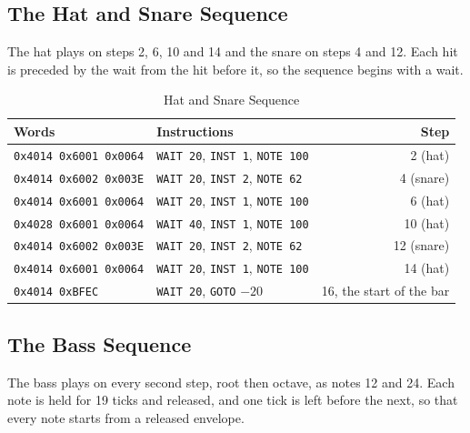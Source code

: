 \subsection{The Hat and Snare Sequence}

The hat plays on steps 2, 6, 10 and 14 and the snare on steps 4 and 12. Each hit is preceded by the wait from the hit
before it, so the sequence begins with a wait.

\begin{table}[H]
	\centering
	\small
	\begin{tabular}{p{5.4cm}p{5.4cm}r}
		\toprule
		\textbf{Words}                & \textbf{Instructions}                                & \textbf{Step}            \\
		\midrule
		\texttt{0x4014 0x6001 0x0064} & \texttt{WAIT 20}, \texttt{INST 1}, \texttt{NOTE 100} & 2 (hat)                  \\
		\texttt{0x4014 0x6002 0x003E} & \texttt{WAIT 20}, \texttt{INST 2}, \texttt{NOTE 62}  & 4 (snare)                \\
		\texttt{0x4014 0x6001 0x0064} & \texttt{WAIT 20}, \texttt{INST 1}, \texttt{NOTE 100} & 6 (hat)                  \\
		\texttt{0x4028 0x6001 0x0064} & \texttt{WAIT 40}, \texttt{INST 1}, \texttt{NOTE 100} & 10 (hat)                 \\
		\texttt{0x4014 0x6002 0x003E} & \texttt{WAIT 20}, \texttt{INST 2}, \texttt{NOTE 62}  & 12 (snare)               \\
		\texttt{0x4014 0x6001 0x0064} & \texttt{WAIT 20}, \texttt{INST 1}, \texttt{NOTE 100} & 14 (hat)                 \\
		\texttt{0x4014 0xBFEC}        & \texttt{WAIT 20}, \texttt{GOTO} $-20$                & 16, the start of the bar \\
		\bottomrule
	\end{tabular}
	\caption{Hat and Snare Sequence}
	\label{tab:ex-hat-pattern}
\end{table}

\subsection{The Bass Sequence}

The bass plays on every second step, root then octave, as notes 12 and 24. Each note is held for 19 ticks and released,
and one tick is left before the next, so that every note starts from a released envelope.

